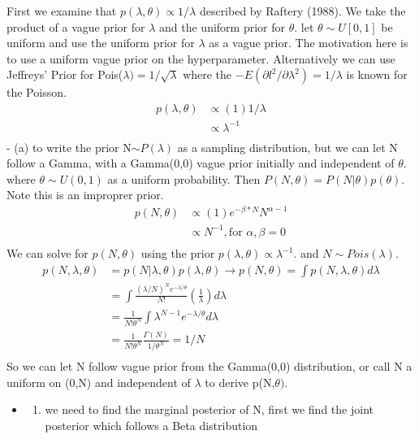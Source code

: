 \documentclass[
]{book}
\providecommand{\tightlist}{%
  \setlength{\itemsep}{0pt}\setlength{\parskip}{0pt}}
\theoremstyle{definition}
\theoremstyle{definition}
\theoremstyle{definition}
\theoremstyle{definition}
\theoremstyle{remark}
\begin{document}
First we examine that \(p(\lambda,\theta)\propto 1/\lambda\) described by Raftery (1988). We take the product of a vague prior for \(\lambda\) and the uniform prior for \(\theta\). let \(\theta \sim U[0,1]\) be uniform and use the uniform prior for \(\lambda\) as a vague prior. The motivation here is to use a uniform vague prior on the hyperparameter. Alternatively we can use Jeffreys' Prior for Pois(\(\lambda) = 1/\sqrt{\lambda}\) where the \(-E(\partial l^2 / \partial \lambda^2) = 1/\lambda\) is known for the Poisson.
\[
\begin{aligned}
 p(\lambda,\theta) &\propto (1)1/\lambda\\
 &\propto \lambda^{-1}\\
\end{aligned}
\]
- (a) to write the prior N\(\sim P(\lambda)\) as a sampling distribution, but we can let N follow a Gamma, with a Gamma(0,0) vague prior initially and independent of \(\theta\). where \(\theta \sim U(0,1)\) as a uniform probability. Then \(P(N,\theta) = P(N|\theta)p(\theta)\). Note this is an improprer prior.\\
\[
\begin{aligned}
 p(N,\theta) &\propto (1)e^{-\beta*N}N^{\alpha-1}\\
 &\propto N^{-1}, \text{for  } \alpha,\beta =0\\
\end{aligned}
\]
We can solve for \(p(N,\theta)\) using the prior \(p(\lambda,\theta)\propto \lambda^{-1}\). and \(N\sim Pois(\lambda)\).
\[ 
\begin{aligned}
p(N,\lambda,\theta) &= p(N|\lambda,\theta)p(\lambda,\theta) \to p(N,\theta) = \int p(N,\lambda,\theta)d\lambda \\
&= \int \frac{(\lambda/N)^Ne^{-\lambda/\theta}}{N!}(\frac{1}{\lambda}) d\lambda\\
&= \frac{1}{N! \theta^N} \int \lambda^{N-1}e^{-\lambda/\theta}d\lambda\\
&= \frac{1}{N! \theta^N}\frac{\Gamma{(N)}}{1/\theta^N} = 1/N\\
\end{aligned}
\]
So we can let N follow vague prior from the Gamma(0,0) distribution, or call N a uniform on (0,N) and independent of \(\lambda\) to derive p(N,\(\theta)\).

\begin{itemize}
\item
  \begin{enumerate}
  \def\labelenumi{(\alph{enumi})}
  \setcounter{enumi}{1}
  \tightlist
  \item
    we need to find the marginal posterior of N, first we find the joint posterior which follows a Beta distribution
  \end{enumerate}
\end{itemize}
\end{document}
